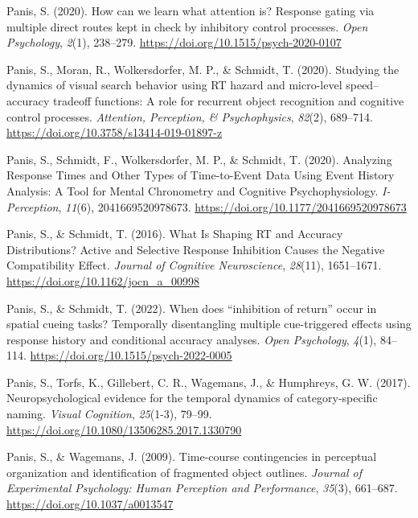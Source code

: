 \documentclass[
  man,floatsintext]{apa6}
\newlength{\cslhangindent}
\newenvironment{CSLReferences}[2] %
 {\begin{list}{}{%
  \setlength{\itemindent}{0pt}
  \setlength{\leftmargin}{0pt}
  \setlength{\parsep}{0pt}
  \ifodd #1
   \setlength{\leftmargin}{\cslhangindent}
   \setlength{\itemindent}{-1\cslhangindent}
  \fi
  \setlength{\itemsep}{#2\baselineskip}}}
 {\end{list}}
\begin{document}
\begin{CSLReferences}{1}{0}
Panis, S. (2020). How can we learn what attention is? {Response} gating via multiple direct routes kept in check by inhibitory control processes. \emph{Open Psychology}, \emph{2}(1), 238--279. \url{https://doi.org/10.1515/psych-2020-0107}

Panis, S., Moran, R., Wolkersdorfer, M. P., \& Schmidt, T. (2020). Studying the dynamics of visual search behavior using {RT} hazard and micro-level speed--accuracy tradeoff functions: {A} role for recurrent object recognition and cognitive control processes. \emph{Attention, Perception, \& Psychophysics}, \emph{82}(2), 689--714. \url{https://doi.org/10.3758/s13414-019-01897-z}

Panis, S., Schmidt, F., Wolkersdorfer, M. P., \& Schmidt, T. (2020). Analyzing {Response Times} and {Other Types} of {Time-to-Event Data Using Event History Analysis}: {A Tool} for {Mental Chronometry} and {Cognitive Psychophysiology}. \emph{I-Perception}, \emph{11}(6), 2041669520978673. \url{https://doi.org/10.1177/2041669520978673}

Panis, S., \& Schmidt, T. (2016). What {Is Shaping RT} and {Accuracy Distributions}? {Active} and {Selective Response Inhibition Causes} the {Negative Compatibility Effect}. \emph{Journal of Cognitive Neuroscience}, \emph{28}(11), 1651--1671. \url{https://doi.org/10.1162/jocn_a_00998}

Panis, S., \& Schmidt, T. (2022). When does {``inhibition of return''} occur in spatial cueing tasks? {Temporally} disentangling multiple cue-triggered effects using response history and conditional accuracy analyses. \emph{Open Psychology}, \emph{4}(1), 84--114. \url{https://doi.org/10.1515/psych-2022-0005}

Panis, S., Torfs, K., Gillebert, C. R., Wagemans, J., \& Humphreys, G. W. (2017). Neuropsychological evidence for the temporal dynamics of category-specific naming. \emph{Visual Cognition}, \emph{25}(1-3), 79--99. \url{https://doi.org/10.1080/13506285.2017.1330790}

Panis, S., \& Wagemans, J. (2009). Time-course contingencies in perceptual organization and identification of fragmented object outlines. \emph{Journal of Experimental Psychology: Human Perception and Performance}, \emph{35}(3), 661--687. \url{https://doi.org/10.1037/a0013547}


\end{CSLReferences}
\end{document}
